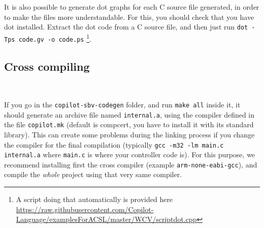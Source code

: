 It is also possible to generate dot graphs for each C source file generated, in
order to make the files more understandable. For this, you should check that
you have dot installed. Extract the dot code from a C source file, and then
just run \texttt{dot -Tps code.gv -o code.ps}
%
\footnote{A script doing that automatically is provided here
\url{https://raw.githubusercontent.com/Copilot-Language/examplesForACSL/master/WCV/scriptdot.cpp}}.

\subsection{Cross compiling}~\label{sec:cross}

If you go in the \texttt{copilot-sbv-codegen} folder, and run {\tt make all}
inside it, it should generate an archive file named \texttt{internal.a}, using
the compiler defined in the file \texttt{copilot.mk} (default is compcert, you
have to install it with its standard library). This can create some problems
during the linking process if you change the compiler for the final compilation
(typically \texttt{gcc -m32 -lm main.c internal.a} where \texttt{main.c} is
where your controller code is). For this purpose, we recommend installing first
the cross compiler (example \texttt{arm-none-eabi-gcc}), and compile the
\emph{whole} project using that very same compiler.
